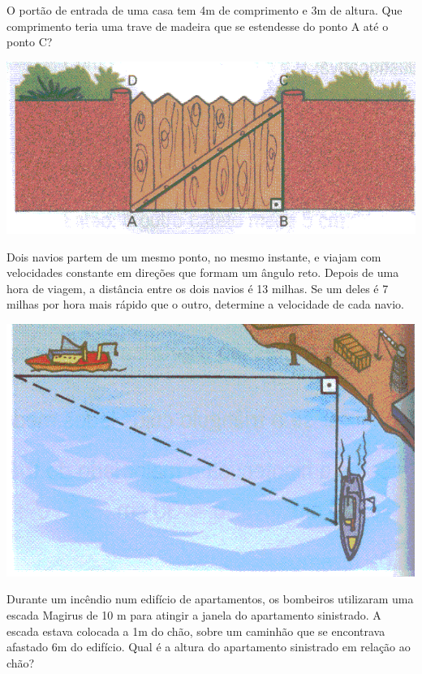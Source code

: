 	\item O portão de entrada de uma casa tem 4m de comprimento e 3m de altura. Que comprimento teria uma trave de madeira que se estendesse do ponto A até o ponto C?
\begin{center}
		\includegraphics[scale=0.5]{figuras/fig74.png}

	\end{center}	
	\item Dois navios partem de um mesmo ponto, no mesmo instante, e viajam com velocidades constante em direções que formam um ângulo reto. Depois de uma hora de viagem, a distância entre os dois navios é 13 milhas. Se um deles é 7 milhas por hora mais rápido que o outro, determine a velocidade de cada navio.
\begin{center}
		\includegraphics[scale=0.5]{figuras/fig75.png}

	\end{center}	
	\item Durante um incêndio num edifício de apartamentos, os bombeiros utilizaram uma escada Magirus de 10 m para atingir a janela do apartamento sinistrado. A escada estava colocada a 1m do chão, sobre um caminhão que se encontrava afastado 6m do edifício. Qual é a altura do apartamento sinistrado em relação ao chão?
